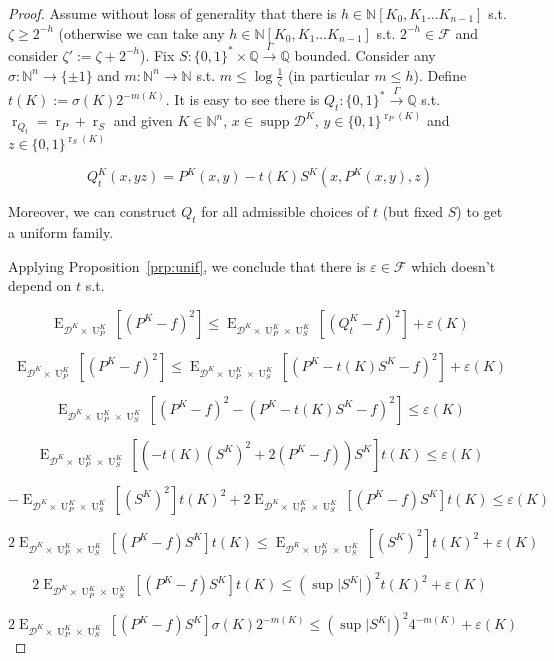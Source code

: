 \documentclass[11pt]{article}
\numberwithin{equation}{section}
\theoremstyle{definition}
\theoremstyle{plain}
\newcommand{\Bool}{\{0,1\}}
\newcommand{\Words}{{\Bool^*}}
\newcommand{\WordsLen}[1]{{\Bool^{#1}}}
\DeclareMathOperator{\Supp}{supp}
\DeclareMathOperator{\E}{E}
\DeclareMathOperator{\R}{r}
\DeclareMathOperator{\Un}{U}
\newcommand{\Nats}{\mathbb{N}}
\newcommand{\Rats}{\mathbb{Q}}
\newcommand{\NatPoly}{\Nats[K_0, K_1 \ldots K_{n-1}]}
\newcommand{\NatFun}{\Nats^n \rightarrow}
\newcommand{\Abs}[1]{\lvert #1 \rvert}
\newcommand{\Dist}{\mathcal{D}}
\newcommand{\Fall}{\mathcal{F}}
\newcommand{\Scheme}{\xrightarrow{\Gamma}}
\begin{document}
\begin{proof}

Assume without loss of generality that there is ${h \in \NatPoly}$ s.t. $\zeta \geq 2^{-h}$ (otherwise we can take any $h \in \NatPoly$ s.t. $2^{-h} \in \Fall$ and consider $\zeta':=\zeta+2^{-h}$). Fix $S: \Words \times \Rats \Scheme \Rats$ bounded. Consider any ${\sigma: \NatFun \{ \pm 1 \}}$ and $m: \NatFun \Nats$ s.t. $m \leq \log \frac{1}{\zeta}$ (in particular ${m \leq h}$). Define ${t(K) := \sigma(K) 2^{-m(K)}}$. It is easy to see there is ${Q_t: \Words \Scheme \Rats}$ s.t. ${\R_{Q_t}=\R_P+\R_S}$ and given $K \in \Nats^n$, $x \in \Supp \Dist^{K}$, ${y \in \WordsLen{\R_P(K)}}$ and ${z \in \WordsLen{ \R_S(K)}}$

$$Q_t^{K}(x,yz) = P^{K}(x,y) - t(K) S^{K}(x,P^{K}(x,y),z)$$

Moreover, we can construct $Q_t$ for all admissible choices of $t$ (but fixed $S$) to get a uniform family.

Applying Proposition~\ref{prp:unif}, we conclude that there is $\varepsilon \in \Fall$ which doesn't depend on $t$ s.t.

$$\E_{\Dist^{K} \times \Un_P^{K}}[(P^{K} - f)^2] \leq \E_{\Dist^{K} \times \Un_P^{K} \times \Un_S^{K}}[(Q_t^{K} - f)^2] + \varepsilon(K)$$

$$\E_{\Dist^{K} \times \Un_P^{K}}[(P^{K} - f)^2] \leq \E_{\Dist^{K} \times \Un_P^{K} \times \Un_S^{K}}[(P^{K} - t(K)S^{K}  - f)^2] + \varepsilon(K)$$

$$\E_{\Dist^{K} \times \Un_P^{K} \times \Un_S^{K}}[(P^{K} - f)^2 - (P^{K} - t(K)S^{K} - f)^2] \leq \varepsilon(K)$$

$$\E_{\Dist^{K} \times \Un_P^{K} \times \Un_S^{K}}[(-t(K)(S^{K})^2 + 2 (P^{K} - f)) S^{K}] t(K) \leq \varepsilon(K)$$

$$-\E_{\Dist^{K} \times \Un_P^{K} \times \Un_S^{K}}[(S^{K})^2] t(K)^2 + 2 \E_{\Dist^{K} \times \Un_P^{K} \times \Un_S^{K}}[(P^{K} - f) S^{K}] t(K) \leq \varepsilon(K)$$

$$2 \E_{\Dist^{K} \times \Un_P^{K} \times \Un_S^{K}}[(P^{K} - f) S^{K}] t(K) \leq \E_{\Dist^{K} \times \Un_P^{K} \times \Un_S^{K}}[(S^{K})^2] t(K)^2 + \varepsilon(K)$$

$$2 \E_{\Dist^{K} \times \Un_P^{K} \times \Un_S^{K}}[(P^{K} - f) S^{K}] t(K) \leq (\sup \Abs{S^{K}})^2 t(K)^2 + \varepsilon(K)$$

$$2 \E_{\Dist^{K} \times \Un_P^{K} \times \Un_S^{K}}[(P^{K} - f) S^{K}] \sigma(K) 2^{-m(K)} \leq (\sup \Abs{S^{K}})^2 4^{-m(K)} + \varepsilon(K)$$


\end{proof}
\end{document}
